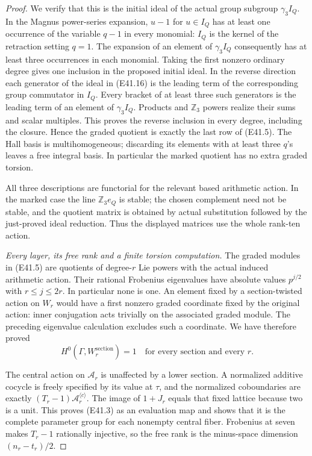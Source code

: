 \begin{proof}
We verify that this is the initial ideal of the
actual group subgroup $\gamma_3I_Q$. In the Magnus
power-series expansion, $u-1$ for $u\in I_Q$ has
at least one occurrence of the variable $q-1$
in every monomial: $I_Q$ is the kernel of the
retraction setting $q=1$. The expansion of an
element of $\gamma_3I_Q$ consequently has at least
three occurrences in each monomial. Taking the
first nonzero ordinary degree gives one inclusion
in the proposed initial ideal. In the reverse
direction each generator of the ideal in
(E41.16) is the leading term of the corresponding
group commutator in $I_Q$. Every bracket of at
least three such generators is the leading term
of an element of $\gamma_3I_Q$. Products and
$\mathbb Z_3$ powers realize their sums and
scalar multiples. This proves the reverse
inclusion in every degree, including the closure.
Hence the graded quotient is exactly the last
row of (E41.5). The Hall basis is multihomogeneous;
discarding its elements with at least three $q$'s
leaves a free integral basis. In particular the
marked quotient has no extra graded torsion.

All three descriptions are functorial for the
relevant based arithmetic action. In the marked
case the line $\mathbb Z_3e_Q$ is stable; the chosen
complement need not be stable, and the quotient
matrix is obtained by actual substitution followed
by the just-proved ideal reduction. Thus the
displayed matrices use the whole rank-ten action.

\emph{Every layer, its free rank and a finite torsion computation.}
The graded modules in (E41.5) are quotients of
degree-$r$ Lie powers with the actual induced
arithmetic action. Their rational Frobenius
eigenvalues have absolute values $p^{j/2}$ with
$r\le j\le2r$. In particular none is one.
An element fixed by a section-twisted action on
$W_r$ would have a first nonzero graded coordinate
fixed by the original action: inner conjugation
acts trivially on the associated graded module.
The preceding eigenvalue calculation excludes
such a coordinate. We have therefore proved
\[
 H^0(\Gamma,W_r^{\mathrm{section}})=1
              \quad\text{for every section and every }r.
 \tag{E41.17}
\]

The central action on $\mathcal A_r$ is unaffected
by a lower section. A normalized additive cocycle
is freely specified by its value at $\tau$, and
the normalized coboundaries are exactly
$(T_r-1)\mathcal A_r^{\langle c\rangle}$.
The image of $1+J_r$ equals that fixed lattice
because two is a unit. This proves (E41.3) as an
evaluation map and shows that it is the complete
parameter group for each nonempty central fiber.
Frobenius at seven makes $T_r-1$ rationally
injective, so the free rank is the minus-space
dimension $(n_r-t_r)/2$.


\end{proof}
